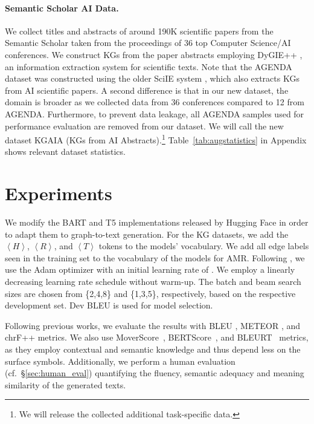 \documentclass[11pt]{article}
\newcommand{\ourtag}[1]{\ensuremath{\left\langle #1 \right\rangle}}
\begin{document}
\begin{table}[t]
\paragraph{Semantic Scholar AI Data.} We collect titles and abstracts of around 190K scientific papers from the Semantic Scholar \cite{ammar-etal-2018-construction} taken from the proceedings of 36 top Computer Science/AI conferences. We construct KGs from the paper abstracts employing DyGIE++ \cite{wadden-etal-2019-entity}, an information extraction system for scientific texts. Note that the AGENDA dataset was constructed using the older SciIE system \cite{luan-etal-2018-multi}, which also extracts KGs from AI scientific papers. A second difference is that in our new dataset, the domain is broader as we collected data from 36 conferences compared to 12 from AGENDA. Furthermore, to prevent data leakage, all AGENDA samples used for performance evaluation are removed from our dataset. We will call the new dataset \textsc{KGAIA} (KGs from AI Abstracts).\footnote{We will release the collected additional task-specific data.} Table~\ref{tab:augstatistics} in Appendix shows relevant dataset statistics.



\section{Experiments}



We modify the BART and T5 implementations released by Hugging Face \citep{wolf2019huggingfaces} in order to adapt them to graph-to-text generation. For the KG datasets, we add the \ourtag{H}, \ourtag{R}, and \ourtag{T} tokens to the models' vocabulary. We add all edge labels seen in the training set to the vocabulary of the models for AMR. Following \citet{wolf2019huggingfaces}, we use the Adam optimizer \cite{kingma:adam} with an initial learning rate of . We employ a linearly decreasing learning rate schedule without warm-up. The batch and beam search sizes are chosen from \{2,4,8\} and \{1,3,5\}, respectively, based on the respective development set. Dev BLEU is used for model selection. 




Following previous works, we evaluate the results with BLEU \cite{Papineni:2002:BMA:1073083.1073135}, METEOR \cite{Denkowski14meteoruniversal}, and chrF++ \cite{popovic-2015-chrf} metrics. We also use MoverScore~\cite{zhao-etal-2019-moverscore}, BERTScore~\cite{bert-score}, and BLEURT~\cite{sellam-etal-2020-bleurt} metrics, as they employ contextual and semantic knowledge and thus depend less on the surface symbols. Additionally, we perform a human evaluation (cf.\ \S\ref{sec:human_eval}) quantifying the fluency, semantic adequacy and meaning similarity of the generated texts.







\end{table}
\end{document}
